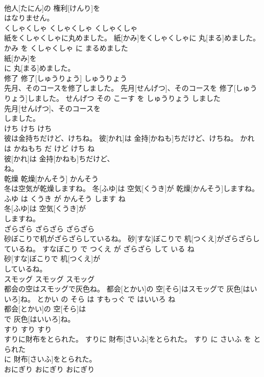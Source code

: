 \documentclass[8pt]{extreport}
\begin{document}
\begin{CJK}{UTF8}{min}
\\	他人[たにん]の 権利[けんり]を
\\	はなりません。			
\\	くしゃくしゃ	くしゃくしゃ	くしゃくしゃ	
\\	紙をくしゃくしゃに丸めました。	紙[かみ]をくしゃくしゃに 丸[まる]めました。	かみ を くしゃくしゃ に まるめました	
\\	紙[かみ]を
\\	に 丸[まる]めました。			
\\	修了	修了[しゅうりょう]	しゅうりょう	
\\	先月、そのコースを修了しました。	先月[せんげつ]、そのコースを 修了[しゅうりょう]しました。	せんげつ その こーす を しゅうりょう しました	
\\	先月[せんげつ]、そのコースを
\\	しました。			
\\	けち	けち	けち	
\\	彼は金持ちだけど、けちね。	彼[かれ]は 金持[かねも]ちだけど、けちね。	かれ は かねもち だ けど けち ね	
\\	彼[かれ]は 金持[かねも]ちだけど、
\\	ね。			
\\	乾燥	乾燥[かんそう]	かんそう	
\\	冬は空気が乾燥しますね。	冬[ふゆ]は 空気[くうき]が 乾燥[かんそう]しますね。	ふゆ は くうき が かんそう します ね	
\\	冬[ふゆ]は 空気[くうき]が
\\	しますね。			
\\	ざらざら	ざらざら	ざらざら	
\\	砂ぼこりで机がざらざらしているね。	砂[すな]ぼこりで 机[つくえ]がざらざらしているね。	すなぼこり で つくえ が ざらざら して いる ね	
\\	砂[すな]ぼこりで 机[つくえ]が
\\	しているね。			
\\	スモッグ	スモッグ	スモッグ	
\\	都会の空はスモッグで灰色ね。	都会[とかい]の 空[そら]はスモッグで 灰色[はいいろ]ね。	とかい の そら は すもっぐ で はいいろ ね	
\\	都会[とかい]の 空[そら]は
\\	で 灰色[はいいろ]ね。			
\\	すり	すり	すり	
\\	すりに財布をとられた。	すりに 財布[さいふ]をとられた。	すり に さいふ を とられた	
\\	に 財布[さいふ]をとられた。			
\\	おにぎり	おにぎり	おにぎり	

\end{CJK}
\end{document}
